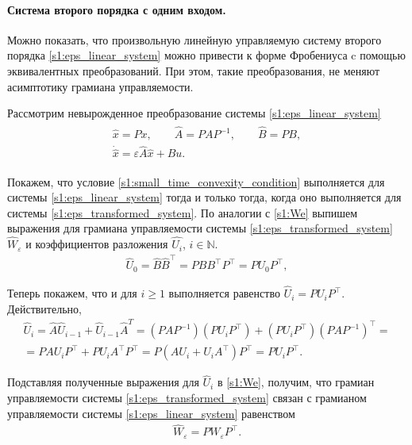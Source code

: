 \documentclass[../main.tex]{subfiles}
\begin{document}
\paragraph{Система второго порядка с одним входом.}
Можно показать, что произвольную линейную управляемую систему второго порядка \eqref{s1:eps_linear_system} можно привести к форме Фробениуса c помощью эквивалентных преобразований.
При этом, такие преобразования, не меняют асимптотику грамиана управляемости.

Рассмотрим невырожденное преобразование системы \eqref{s1:eps_linear_system}
\begin{gather}\label{s1:eps_transformed_system}
\begin{gathered}
	\hat{x} = P x, \qquad \hat{A} = P A P^{-1}, \qquad \hat{B} = P B, \\
	\dot{\hat{x}} = \varepsilon \hat{A} \hat{x} + \hat{B} u. 
\end{gathered}
\end{gather}

Покажем, что условие \eqref{s1:small_time_convexity_condition} выполняется для системы \eqref{s1:eps_linear_system} тогда и только тогда, когда оно выполняется для системы \eqref{s1:eps_transformed_system}.
 По аналогии с \eqref{s1:We} выпишем выражения для грамиана управляемости системы \eqref{s1:eps_transformed_system} $\hat{W}_{\varepsilon}$  и коэффициентов разложения $\hat{U_i}$, $i \in \mathbb{N}$.
\begin{gather*}
	\hat{U}_0 = \hat{B} \hat{B}^{\top} = P B B^{\top} P^{\top} = P U_0 P^{\top}, 
\end{gather*}

Теперь покажем, что и для $i \geqslant 1$ выполняется  равенство $\hat{U}_i = P U_i P^{\top}$.
Действительно,
\begin{gather*}
	\hat{U}_i  = \hat{A} \hat{U}_{i-1} + \hat{U}_{i-1} \hat{A}^T = \left(P A P^{-1} \right)  \left(  P U_i P^{\top} \right)  +  \left(  P U_i P^{\top}\right) \left(P A P^{-1} \right)^{\top} = \\ 
	= P A U_i P^{\top}   +  P U_i A^{\top} P^{\top} = P \left( A U_i   +  U_i A^{\top} \right) P^{\top}  = P U_i P^{\top}.
\end{gather*}

Подставляя полученные выражения для $\hat{U}_i$ в \eqref{s1:We}, получим, что  грамиан управляемости  системы \eqref{s1:eps_transformed_system} связан с грамианом управляемости системы \eqref{s1:eps_linear_system} равенством
\begin{gather}
	\hat{W}_{\varepsilon} = P W_{\varepsilon} P^{\top}.
\end{gather}
\end{document}
